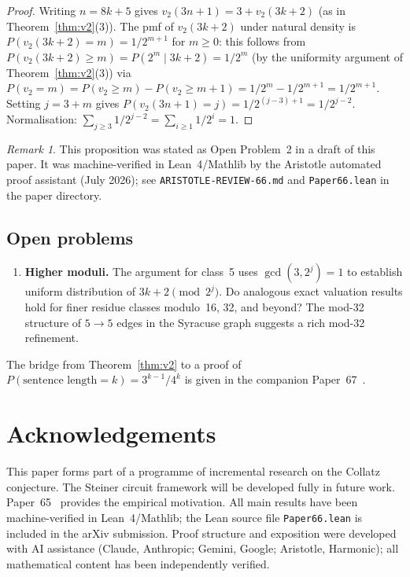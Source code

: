 \documentclass[12pt]{article}
\theoremstyle{definition}
\theoremstyle{remark}
\newtheorem{remark}[theorem]{Remark}
\newcommand{\vt}{v_2}
\begin{document}
\begin{proof}
Writing $n = 8k+5$ gives $\vt(3n+1) = 3 + \vt(3k+2)$
(as in Theorem~\ref{thm:v2}(3)).
The pmf of $\vt(3k+2)$ under natural density is
$P(\vt(3k+2) = m) = 1/2^{m+1}$ for $m \geq 0$:
this follows from $P(\vt(3k+2) \geq m) = P(2^m \mid 3k+2) = 1/2^m$
(by the uniformity argument of Theorem~\ref{thm:v2}(3)) via
$P(\vt = m) = P(\vt \geq m) - P(\vt \geq m+1) = 1/2^m - 1/2^{m+1} = 1/2^{m+1}$.
Setting $j = 3 + m$ gives $P(\vt(3n+1) = j) = 1/2^{(j-3)+1} = 1/2^{j-2}$.
Normalisation: $\sum_{j \geq 3} 1/2^{j-2} = \sum_{i \geq 1} 1/2^i = 1$.
\end{proof}

\begin{remark}
This proposition was stated as Open Problem~2 in a draft of this paper.
It was machine-verified in Lean~4/Mathlib by the Aristotle automated
proof assistant (July 2026); see \texttt{ARISTOTLE-REVIEW-66.md} and
\texttt{Paper66.lean} in the paper directory.
\end{remark}

\subsection*{Open problems}

\begin{enumerate}
  \item \textbf{Higher moduli.} The argument for class~5 uses $\gcd(3,2^j)=1$
        to establish uniform distribution of $3k+2 \pmod{2^j}$. Do analogous
        exact valuation results hold for finer residue classes modulo~16, 32,
        and beyond? The mod-32 structure of $5\to5$ edges in the Syracuse
        graph suggests a rich mod-32 refinement.
\end{enumerate}

The bridge from Theorem~\ref{thm:v2} to a proof of
$P(\text{sentence length} = k) = 3^{k-1}/4^k$ is given in the companion
Paper~67~\cite{paper67}.

\section*{Acknowledgements}

This paper forms part of a programme of incremental research on the Collatz conjecture.
The Steiner circuit framework will be developed fully in future work. Paper~65~\cite{paper65} provides the
empirical motivation. All main results have been machine-verified in Lean~4/Mathlib;
the Lean source file \texttt{Paper66.lean} is included in the arXiv submission.
Proof structure and exposition were developed with AI assistance (Claude,
Anthropic; Gemini, Google; Aristotle, Harmonic); all mathematical content
has been independently verified.
\end{document}
